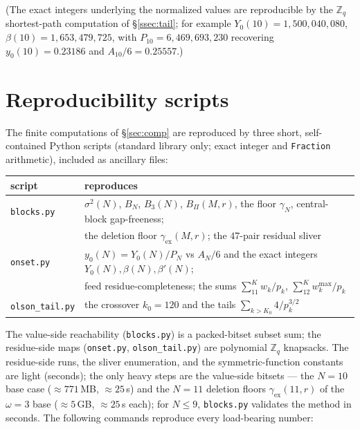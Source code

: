 \documentclass[11pt]{amsart}
\theoremstyle{plain}
\theoremstyle{definition}
\newcommand{\Z}{\mathbb{Z}}
\begin{document}
\noindent
(The exact integers underlying the normalized values are reproducible by the
$\Z_q$ shortest-path computation of \S\ref{ssec:tail}; for example
$Y_0(10)=1{,}500{,}040{,}080$, $\beta(10)=1{,}653{,}479{,}725$, with
$P_{10}=6{,}469{,}693{,}230$ recovering $y_0(10)=0.23186$ and $A_{10}/6=0.25557$.)

\section{Reproducibility scripts}\label{app:scripts}
The finite computations of \S\ref{sec:comp} are reproduced by three short,
self-contained Python scripts (standard library only; exact integer and
\texttt{Fraction} arithmetic), included as ancillary files:
\begin{center}
\begin{tabular}{@{}ll@{}}
\toprule
script & reproduces \\
\midrule
\texttt{blocks.py} & $\sigma^2(N)$, $B_N$, $B_3(N)$, $B_\Pi(M,r)$, the floor $\gamma_N$, central-block gap-freeness; \\
 & the deletion floor $\gamma_{\mathrm{ex}}(M,r)$; the $47$-pair residual sliver \\
\texttt{onset.py} & $y_0(N)=Y_0(N)/P_N$ vs $A_N/6$ and the exact integers $Y_0(N),\beta(N),\beta'(N)$; \\
 & feed residue-completeness; the sums $\sum_{11}^{K}w_k/p_k$, $\sum_{12}^{K}w_k^{\max}/p_k$ \\
\texttt{olson\_tail.py} & the crossover $k_0=120$ and the tails $\sum_{k>K_0}4/p_k^{3/2}$ \\
\bottomrule
\end{tabular}
\end{center}
The value-side reachability (\texttt{blocks.py}) is a packed-bitset subset sum; the
residue-side maps (\texttt{onset.py}, \texttt{olson\_tail.py}) are polynomial
$\Z_q$ knapsacks.  The residue-side runs, the sliver enumeration, and the
symmetric-function constants are light (seconds); the only heavy steps are the
value-side bitsets --- the $N=10$ base case ($\approx771$\,MB, $\approx25$\,s) and
the $N=11$ deletion floors $\gamma_{\mathrm{ex}}(11,r)$ of the $\omega=3$ base
($\approx5$\,GB, $\approx25$\,s each); for $N\le9$, \texttt{blocks.py} validates the
method in seconds.  The following commands reproduce every load-bearing number:
\end{document}
